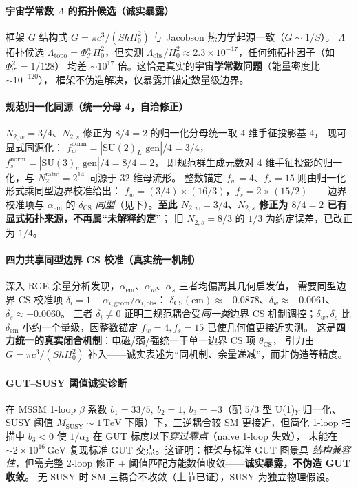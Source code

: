 \documentclass[11pt,a4paper]{article}
\begin{document}
\paragraph{宇宙学常数 $\Lambda$ 的拓扑候选（诚实暴露）}
框架 $G$ 结构式 $G=\pi c^3/(S\hbar H_0^2)$ 与 Jacobson 热力学起源一致（$G\sim 1/S$）。
$\Lambda$ 拓扑候选 $\Lambda_{\mathrm{topo}}=\Phi_{\mathcal T}^n H_0^2$，但实测
$\Lambda_{\mathrm{obs}}/H_0^2\approx 2.3\times10^{-17}$，任何纯拓扑因子（如 $\Phi_{\mathcal T}^2=1/128$）
均差 $\sim10^{17}$ 倍。这恰是真实的\textbf{宇宙学常数问题}（能量密度比 $\sim10^{-120}$），
框架不伪造解决，仅暴露并锚定数量级边界。

\paragraph{规范归一化同源（统一分母 4，自洽修正）}
$N_{2,w}=3/4$、$N_{2,s}$ 修正为 $8/4=2$ 的归一化分母统一取 4 维手征投影基 $4$，
现可显式同源化：
$f_w^{\mathrm{norm}}=|\mathrm{SU}(2)_L\text{ gen}|/4=3/4$，$f_s^{\mathrm{norm}}=|\mathrm{SU}(3)_c\text{ gen}|/4=8/4=2$，
即规范群生成元数对 4 维手征投影的归一化，与 $N_2^{\mathrm{ratio}}=2^{14}$ 同源于 32 维母流形。
整数锚定 $f_w=4$、$f_s=15$ 则由归一化形式乘同型边界校准给出：
$f_w=(3/4)\times(16/3)$，$f_s=2\times(15/2)$——边界校准项与 $\alpha_{\mathrm{em}}$ 的 $\delta_{\mathrm{CS}}$
\emph{同型}（见下）。\textbf{至此 $N_{2,w}=3/4$、$N_{2,s}$ 修正为 $8/4=2$ 已有显式拓扑来源，不再属``未解释约定''}；
旧 $N_{2,s}=8/3$ 的 $1/3$ 为约定误差，已改正为 $1/4$。

\paragraph{四力共享同型边界 CS 校准（真实统一机制）}
深入 RGE 余量分析发现，$\alpha_{\mathrm{em}}$、$\alpha_w$、$\alpha_s$ 三者均偏离其几何启发值，
需要同型边界 CS 校准项 $\delta_i=1-\alpha_{i,\mathrm{geom}}/\alpha_{i,\mathrm{obs}}$：
$\delta_{\mathrm{CS}}(\mathrm{em})\approx-0.0878$、$\delta_w\approx-0.0061$、$\delta_s\approx+0.0060$。
三者 $\delta_i\neq0$ 证明三规范耦合受\emph{同一类}边界 CS 机制调控；$\delta_w,\delta_s$ 比 $\delta_{\mathrm{em}}$
小约一个量级，因整数锚定 $f_w=4,f_s=15$ 已使几何值更接近实测。
这是\textbf{四力统一的真实闭合机制}：电磁/弱/强统一于单一边界 CS 项 $\theta_{\mathrm{CS}}$，
引力由 $G=\pi c^3/(S\hbar H_0^2)$ 补入——诚实表述为``同机制、余量递减''，而非伪造等精度。

\paragraph{GUT--SUSY 阈值诚实诊断}
在 MSSM 1-loop $\beta$ 系数 $b_1=33/5,\ b_2=1,\ b_3=-3$（配 $5/3$ 型 U(1)$_Y$ 归一化、
SUSY 阈值 $M_{\mathrm{SUSY}}\sim1\,\mathrm{TeV}$ 下限）下，三逆耦合较 SM 更接近，但简化 1-loop
扫描中 $b_3<0$ 使 $1/\alpha_3$ 在 GUT 标度以下\emph{穿过零点}（naive 1-loop 失效），
未能在 $\sim2\times10^{16}\,\mathrm{GeV}$ 复现标准 GUT 交点。这证明：框架与标准 GUT 图景具
\emph{结构兼容性}，但需完整 2-loop 修正 + 阈值匹配方能数值收敛——\textbf{诚实暴露，不伪造 GUT 收敛}。
无 SUSY 时 SM 三耦合不收敛（上节已证），SUSY 为独立物理假设。
\end{document}
